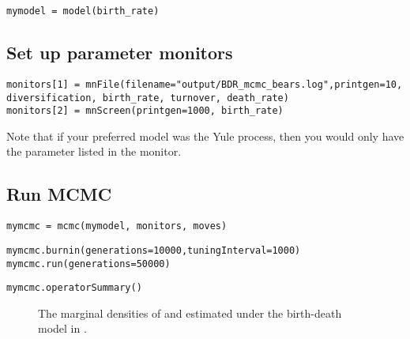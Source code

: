 {\tt \begin{snugshade*}
\begin{lstlisting}
mymodel = model(birth_rate)
\end{lstlisting}
\end{snugshade*}}


\subsection{Set up parameter monitors}


{\tt \begin{snugshade*}
\begin{lstlisting}
monitors[1] = mnFile(filename="output/BDR_mcmc_bears.log",printgen=10, diversification, birth_rate, turnover, death_rate)
monitors[2] = mnScreen(printgen=1000, birth_rate)
\end{lstlisting}
\end{snugshade*}}

Note that if your preferred model was the Yule process, then you would only have the  parameter listed in the  monitor.

\subsection{Run MCMC}

{\tt \begin{snugshade*}
\begin{lstlisting}
mymcmc = mcmc(mymodel, monitors, moves)
\end{lstlisting}
\end{snugshade*}}

{\tt \begin{snugshade*}
\begin{lstlisting}
mymcmc.burnin(generations=10000,tuningInterval=1000)
mymcmc.run(generations=50000)
\end{lstlisting}
\end{snugshade*}}

{\tt \begin{snugshade*}
\begin{lstlisting}
mymcmc.operatorSummary()
\end{lstlisting}
\end{snugshade*}}

\begin{figure}[h!]
\centering
{}
\caption{\small The marginal densities of  and  estimated under the birth-death model in \RevBayes.}
\label{tracerMarg}
\end{figure}






